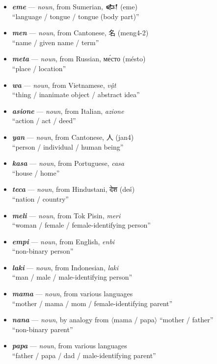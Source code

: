 \documentclass[a4paper, titlepage]{article}
\begin{document}
\begin{itemize}
	\item \textbf{\textit{eme}} — \textit{noun}, from Sumerian, {\cuneiffont 𒅴} (eme) \\``language / tongue / tongue (body part)''
	\item \textbf{\textit{men}} — \textit{noun}, from Cantonese, 名 (meng4-2) \\``name / given name / term''
	\item \textbf{\textit{meta}} — \textit{noun}, from Russian, ме́сто (mésto) \\``place / location''
	\item \textbf{\textit{wa}} — \textit{noun}, from Vietnamese, \textit{vật} \\``thing / inanimate object / abstract idea''
	\item \textbf{\textit{asione}} — \textit{noun}, from Italian, \textit{azione} \\``action / act / deed''
	\item \textbf{\textit{yan}} — \textit{noun}, from Cantonese, 人 (jan4) \\``person / individual / human being''
	\item \textbf{\textit{kasa}} — \textit{noun}, from Portuguese, \textit{casa} \\``house / home''
	\item \textbf{\textit{teca}} — \textit{noun}, from Hindustani, {\hmfont देश} (deś) \\``nation / country''
	\item \textbf{\textit{meli}} — \textit{noun}, from Tok Pisin, \textit{meri} \\``woman / female / female-identifying person''
	\item \textbf{\textit{empi}} — \textit{noun}, from English, \textit{enbi} \\``non-binary person''
	\item \textbf{\textit{laki}} — \textit{noun}, from Indonesian, \textit{laki} \\``man / male / male-identifying person''
	\item \textbf{\textit{mama}} — \textit{noun}, from various languages \\``mother / mama / mom / female-identifying parent''
	\item \textbf{\textit{nana}} — \textit{noun}, by analogy from $\langle$mama / papa$\rangle$ ``mother / father'' \\``non-binary parent''
	\item \textbf{\textit{papa}} — \textit{noun}, from various languages \\``father / papa / dad / male-identifying parent''

\end{itemize}
\end{document}
